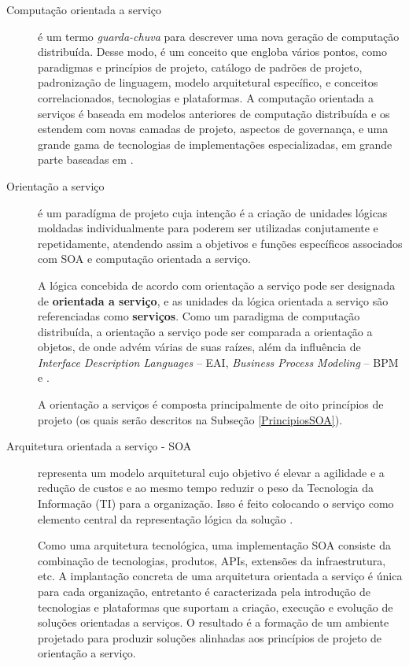 \begin{description}
\item [Computação orientada a serviço] é um termo \textit{guarda-chuva} para
descrever uma nova geração de computação distribuída. Desse modo, é um conceito
que engloba vários pontos, como paradigmas e princípios de projeto, catálogo de
padrões de projeto, padronização de linguagem, modelo arquitetural específico, e
conceitos correlacionados, tecnologias e plataformas.
A computação orientada a serviços é baseada em modelos anteriores de computação
distribuída e os estendem com novas camadas de projeto, aspectos de governança,
e uma grande gama de tecnologias de implementações especializadas, em grande
parte baseadas em \ws{} \cite{erl2009web}.

\item [Orientação a serviço] é um paradígma de projeto cuja intenção é a criação
de unidades lógicas moldadas individualmente para poderem ser utilizadas
conjutamente e repetidamente, atendendo assim a objetivos e
funções específicos associados com SOA e computação orientada a serviço.

A lógica concebida de acordo com orientação a serviço pode ser designada de
\textbf{orientada a serviço}, e as unidades da lógica orientada a serviço são
referenciadas como \textbf{serviços}. Como um paradigma de computação
distribuída, a orientação a serviço pode ser comparada a orientação a objetos,
de onde advém várias de suas raízes, além da influência de
\textit{Interface Description Languages} -- EAI,
\textit{Business Process Modeling} -- BPM e \ws \cite{erl2009web}.

A orientação a serviços é composta principalmente de oito princípios de projeto
(os quais serão descritos na Subseção \ref{PrincipiosSOA}).

\item [Arquitetura orientada a serviço - SOA] representa um modelo arquitetural
cujo objetivo é elevar a agilidade e a redução de custos e ao mesmo tempo
reduzir o peso da Tecnologia da Informação (TI) para a organização. Isso é feito
colocando o serviço como elemento central da representação lógica da solução \cite{erl2009web}.

Como uma arquitetura tecnológica, uma implementação SOA consiste da combinação
de tecnologias, produtos, APIs, extensões da infraestrutura, etc. A implantação
concreta de uma arquitetura orientada a serviço é única para cada organização,
entretanto é caracterizada pela introdução de tecnologias e plataformas que
suportam a criação, execução e evolução de soluções orientadas a serviços. O
resultado é a formação de um ambiente projetado para produzir soluções alinhadas
aos princípios de projeto de orientação a serviço.


\end{description}
